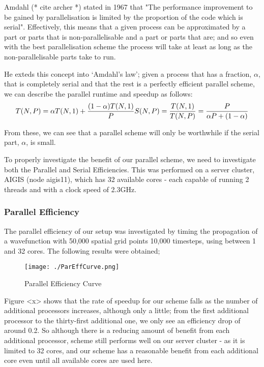 Amdahl (* cite archer *) stated in 1967 that "The performance improvement to be gained by parallelisation is limited by the proportion of the code which is serial". Effectively, this means that a given process can be approximated by a part or parts that is non-parallelisable and a part or parts that are; and so even with the best parallelisation scheme the process will take at least as long as the non-parallelisable parts take to run. 

He exteds this concept into `Amdahl's law'; given a process that has a fraction, $\alpha$, that is completely serial and that the rest is a perfectly efficient parallel scheme, we can describe the parallel runtime and speedup as follows:
$$
T(N, P)=\alpha T(N, 1)+\frac{(1-\alpha) T(N, 1)}{P}\\
S(N, P)=\frac{T(N, 1)}{T(N, P)}=\frac{P}{\alpha P+(1-\alpha)}
$$

From these, we can see that a parallel scheme will only be worthwhile if the serial part, $\alpha$, is small. 

To properly investigate the benefit of our parallel scheme, we need to investigate both the Parallel and Serial Efficiencies. This was performed on a server cluster, AIGIS (node aigis11), which has 32 available cores - each capable of running 2 threads and with a clock speed of 2.3GHz. 

\subsubsection{Parallel Efficiency}
The parallel efficiency of our setup was investigated by timing the propagation of a wavefunction with 50,000 spatial grid points 10,000 timesteps, using between 1 and 32 cores. The following results were obtained;

\begin{figure}[H]
         \texttt{[image: ./ParEffCurve.png]}
         \centering
         \caption{Parallel Efficiency Curve}
\end{figure}


Figure <x> shows that the rate of speedup for our scheme falls as the number of additional processors increases, although only a little; from the first additional processor to the thirty-first additional one, we only see an efficiency drop of around 0.2. So although there is a reducing amount of benefit from each additional processor, scheme still performs well on our server cluster - as it is limited to 32 cores, and our scheme has a reasonable benefit from each additional core even until all available cores are used here.

